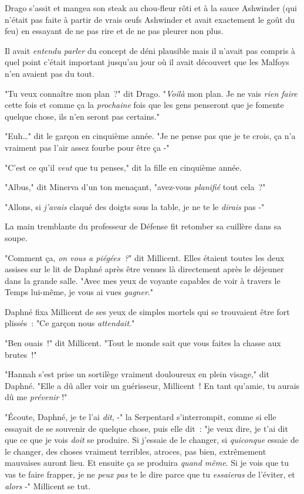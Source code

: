 \later

Drago s'assit et mangea son steak au chou-fleur rôti et à la sauce Ashwinder (qui n'était pas faite à partir de vrais œufs Ashwinder et avait exactement le goût du feu) en essayant de ne pas rire et de ne pas pleurer non plus.

Il avait \emph{entendu parler} du concept de déni plausible mais il n'avait pas compris à quel point c'était important jusqu'au jour où il avait découvert que les Malfoys n'en avaient pas du tout.

"Tu veux connaître mon plan~?" dit Drago. "\emph{Voilà} mon plan. Je ne vais \emph{rien faire} cette fois et comme ça la \emph{prochaine} fois que les gens penseront que je fomente quelque chose, ils n'en seront pas certains."

"Euh…" dit le garçon en cinquième année. "Je ne pense pas que je te crois, ça n'a vraiment pas l'air assez fourbe pour être ça -"

"C'est ce qu'il \emph{veut} que tu penses," dit la fille en cinquième année.

\later

"Albus," dit Minerva d'un ton menaçant, "avez-vous \emph{planifié} tout cela~?"

\later

"Allons, si \emph{j'avais} claqué des doigts sous la table, je ne te le \emph{dirais} pas -"

\later

La main tremblante du professeur de Défense fit retomber sa cuillère dans sa soupe.

\later

"Comment ça, \emph{on vous a piégées~?}" dit Millicent. Elles étaient toutes les deux assises sur le lit de Daphné après être venues là directement après le déjeuner dans la grande salle. "Avec mes yeux de voyante capables de voir à travers le Temps lui-même, je vous ai vues \emph{gagner}."

Daphné fixa Millicent de ses yeux de simples mortels qui se trouvaient être fort plissés~: "Ce garçon nous \emph{attendait}."

"Ben ouais~!" dit Millicent. "Tout le monde sait que vous faites la chasse aux brutes~!"

"Hannah s'est prise un sortilège vraiment douloureux en plein visage," dit Daphné. "Elle a dû aller voir un guérisseur, Millicent~! En tant qu'amie, tu aurais dû me \emph{prévenir} !"

"Écoute, Daphné, je te l'ai \emph{dit}, -" la Serpentard s'interrompit, comme si elle essayait de se souvenir de quelque chose, puis elle dit~: "je veux dire, je t'ai dit que ce que je vois \emph{doit} se produire. Si j'essaie de le changer, si \emph{quiconque} essaie de le changer, des choses vraiment terribles, atroces, pas bien, extrêmement mauvaises auront lieu. Et ensuite ça se produira \emph{quand même}. Si je vois que tu vas te faire frapper, je ne \emph{peux pas} te le dire parce que tu \emph{essaieras} de l'éviter, et \emph{alors} -" Millicent se tut.


